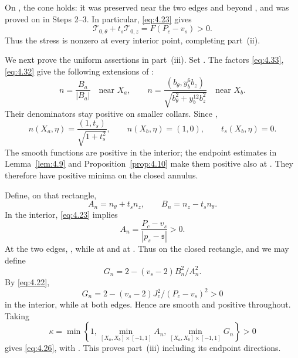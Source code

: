 On , the cone holds: it was preserved near the
two edges and beyond , and was proved on
 in Steps 2--3. In particular, \eqref{eq:4.23}
gives
\[
\mathcal T_{0,\theta}+t_s\mathcal T_{0,z}=F(P_c-v_s)>0.
\]
Thus the stress is nonzero at every interior point, completing part~\textup{(ii)}.

We next prove the uniform assertions in part~\textup{(iii)}. Set
. The factors
\eqref{eq:4.33}, \eqref{eq:4.32} give the following extensions of
:
\[
n=\frac{B_a}{|B_a|}\quad\text{near }X_a,
\qquad
n=\frac{(b_\theta,y_b^6b_z)}{\sqrt{b_\theta^2+y_b^{12}b_z^2}}
\quad\text{near }X_b.
\]
Their denominators stay positive on smaller collars. Since
,
\[
n(X_a,\eta)=\frac{(1,t_s)}{\sqrt{1+t_s^2}},
\qquad n(X_b,\eta)=(1,0),
\qquad t_s(X_b,\eta)=0.
\]
The smooth functions  are positive in the
interior; the endpoint estimates in Lemma~\ref{lem:4.9} and
Proposition~\ref{prop:4.10} make them positive also at
. They therefore have positive minima on the closed
annulus.

Define, on that rectangle,
\[
A_n=n_\theta+t_sn_z,
\qquad B_n=n_z-t_sn_\theta.
\]
In the interior, \eqref{eq:4.23} implies
\[
A_n=\frac{P_c-v_s}{|p_s-\mathfrak s|}>0.
\]
At the two edges, , while
 at  and
 at . Thus
 on the closed rectangle, and we may define
\[
G_n=2-(v_s-2)B_n^2/A_n^2.
\]
By \eqref{eq:4.22},
\[
G_n=2-(v_s-2)J_c^2/(P_c-v_s)^2>0
\]
in the interior, while  at both edges. Hence
 are smooth and positive throughout. Taking
\[
\kappa=\min\left\{1,
\min_{[X_a,X_b]\times[-1,1]}A_n,
\min_{[X_a,X_b]\times[-1,1]}G_n\right\}>0
\]
gives \eqref{eq:4.26}, with . This proves
part~\textup{(iii)} including its endpoint directions.

